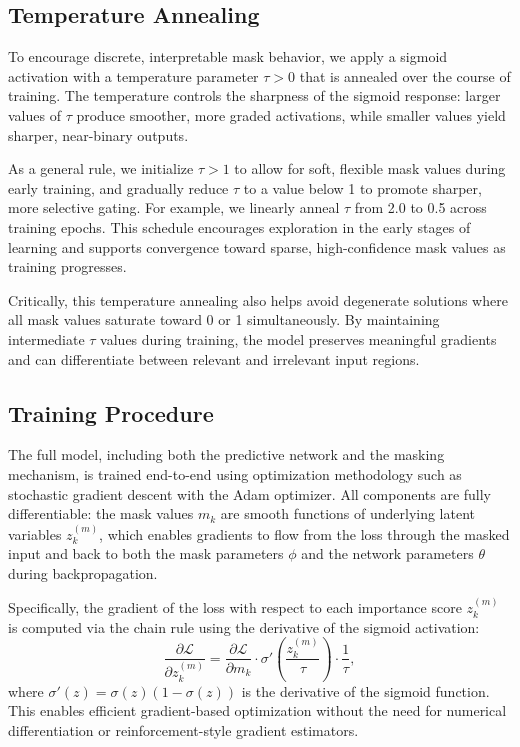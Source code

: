 \documentclass[12pt]{article}
\begin{document}
\subsection{Temperature Annealing}

To encourage discrete, interpretable mask behavior, we apply a sigmoid activation with a temperature parameter \( \tau > 0 \) that is annealed over the course of training. The temperature controls the sharpness of the sigmoid response: larger values of \( \tau \) produce smoother, more graded activations, while smaller values yield sharper, near-binary outputs. 

As a general rule, we initialize \( \tau > 1 \) to allow for soft, flexible mask values during early training, and gradually reduce \( \tau \) to a value below 1 to promote sharper, more selective gating. For example, we linearly anneal \( \tau \) from 2.0 to 0.5 across training epochs. This schedule encourages exploration in the early stages of learning and supports convergence toward sparse, high-confidence mask values as training progresses.

Critically, this temperature annealing also helps avoid degenerate solutions where all mask values saturate toward 0 or 1 simultaneously. By maintaining intermediate \( \tau \) values during training, the model preserves meaningful gradients and can differentiate between relevant and irrelevant input regions.


\subsection{Training Procedure}

The full model, including both the predictive network and the masking mechanism, is trained end-to-end using optimization methodology such as stochastic gradient descent with the Adam optimizer. All components are fully differentiable: the mask values \( m_k \) are smooth functions of underlying latent variables \( z_k^{(m)} \), which enables gradients to flow from the loss through the masked input and back to both the mask parameters \( \phi \) and the network parameters \( \theta \) during backpropagation.

Specifically, the gradient of the loss with respect to each importance score \( z_k^{(m)} \) is computed via the chain rule using the derivative of the sigmoid activation:
\[
\frac{\partial \mathcal{L}}{\partial z_k^{(m)}} = \frac{\partial \mathcal{L}}{\partial m_k} \cdot \sigma'\left( \frac{z_k^{(m)}}{\tau} \right) \cdot \frac{1}{\tau},
\]
where \( \sigma'(z) = \sigma(z)(1 - \sigma(z)) \) is the derivative of the sigmoid function. This enables efficient gradient-based optimization without the need for numerical differentiation or reinforcement-style gradient estimators.
\end{document}
